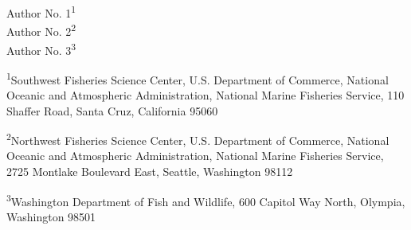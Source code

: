 
\begin{center}
\thispagestyle{empty}


\vspace{.5cm}




Author No. 1\textsuperscript{1}\\
Author No. 2\textsuperscript{2}\\
Author No. 3\textsuperscript{3}\\

\vspace{.5cm}

\small
\textsuperscript{1}Southwest Fisheries Science Center, U.S. Department of Commerce, National Oceanic and Atmospheric Administration, National Marine Fisheries Service, 110 Shaffer Road, Santa Cruz, California 95060\\

\vspace{.3cm}

\textsuperscript{2}Northwest Fisheries Science Center, U.S. Department of Commerce, National Oceanic and Atmospheric Administration, National Marine Fisheries Service, 2725 Montlake Boulevard East, Seattle, Washington 98112\\

\vspace{.3cm}

\textsuperscript{3}Washington Department of Fish and Wildlife, 600 Capitol Way North, Olympia, Washington 98501\\


\vspace{.5cm}


\end{center}
